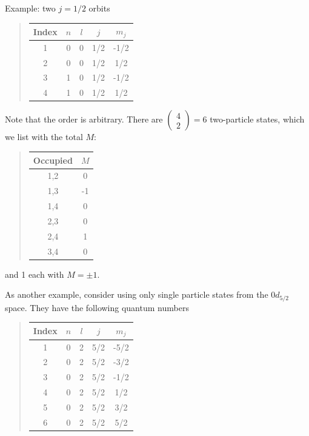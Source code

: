 Example: two $j=1/2$ orbits


\begin{quote}
\begin{tabular}{ccccc}
\hline
\multicolumn{1}{c}{ Index } & \multicolumn{1}{c}{ $n$ } & \multicolumn{1}{c}{ $l$ } & \multicolumn{1}{c}{ $j$ } & \multicolumn{1}{c}{ $m_j$ } \\
\hline
1     & 0   & 0   & 1/2 & -1/2  \\
2     & 0   & 0   & 1/2 & 1/2   \\
3     & 1   & 0   & 1/2 & -1/2  \\
4     & 1   & 0   & 1/2 & 1/2   \\
\hline
\end{tabular}
\end{quote}

\noindent
Note that the order is arbitrary.
There are $\left ( \begin{array}{c} 4 \\ 2 \end{array} \right) = 6$ two-particle states, 
which we list with the total $M$:


\begin{quote}
\begin{tabular}{cc}
\hline
\multicolumn{1}{c}{ Occupied } & \multicolumn{1}{c}{ $M$ } \\
\hline
1,2      & 0   \\
1,3      & -1  \\
1,4      & 0   \\
2,3      & 0   \\
2,4      & 1   \\
3,4      & 0   \\
\hline
\end{tabular}
\end{quote}

\noindent
and 1 each with $M = \pm 1$.




As another example, consider using only single particle states from the $0d_{5/2}$ space. 
They have the following quantum numbers


\begin{quote}
\begin{tabular}{ccccc}
\hline
\multicolumn{1}{c}{ Index } & \multicolumn{1}{c}{ $n$ } & \multicolumn{1}{c}{ $l$ } & \multicolumn{1}{c}{ $j$ } & \multicolumn{1}{c}{ $m_j$ } \\
\hline
1     & 0   & 2   & 5/2 & -5/2  \\
2     & 0   & 2   & 5/2 & -3/2  \\
3     & 0   & 2   & 5/2 & -1/2  \\
4     & 0   & 2   & 5/2 & 1/2   \\
5     & 0   & 2   & 5/2 & 3/2   \\
6     & 0   & 2   & 5/2 & 5/2   \\
\hline
\end{tabular}
\end{quote}

